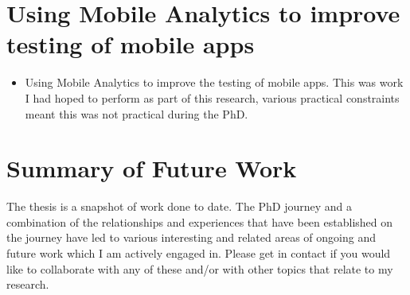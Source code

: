 \section{Using Mobile Analytics to improve testing of mobile apps}
\begin{itemize}
    \item Using Mobile Analytics to improve the testing of mobile apps. This was work I had hoped to perform as part of this research, various practical constraints meant this was not practical during the PhD.
\end{itemize}

\section{Summary of Future Work}
The thesis is a snapshot of work done to date. The PhD journey and a combination of the relationships and experiences that have been established on the journey have led to various interesting and related areas of ongoing and future work which I am actively engaged in. Please get in contact if you would like to collaborate with any of these and/or with other topics that relate to my research.
